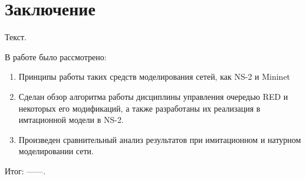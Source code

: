 \chapter*{Заключение}

Текст.

В работе было рассмотрено:
\begin{enumerate}
\item Принципы работы таких средств моделирования сетей, как NS-2 и Mininet 
\item Сделан обзор алгоритма работы дисциплины управления очередью RED и некоторых его модификаций, а также
  разработаны их реализация в имтационной модели в NS-2.
\item Произведен сравнительный анализ результатов при имитационном и натурном моделировании сети. 
\end{enumerate}
Итог: ------. 


\clearpage



